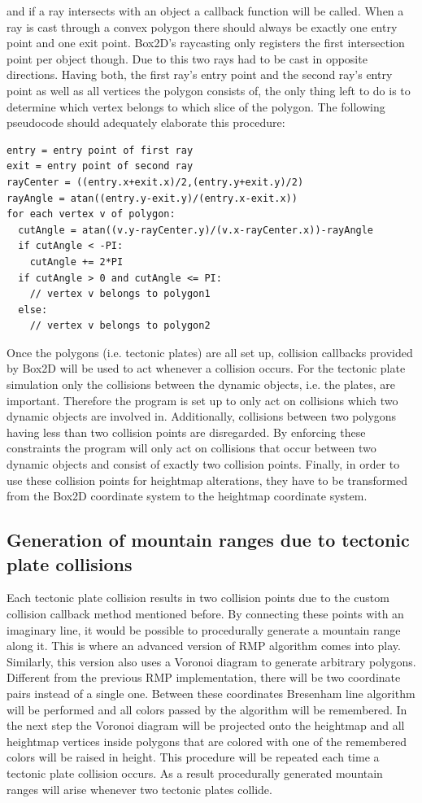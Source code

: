 \documentclass[11pt,a4paper,twoside,openright]{report}
\begin{document}
and if a ray intersects with an object a callback function will be called. When a ray is cast through a convex polygon there should always be exactly one entry point and one exit point. Box2D's raycasting only registers the first intersection point per object though. Due to this two rays had to be cast in opposite directions. Having both, the first ray's entry point and the second ray's entry point as well as all vertices the polygon consists of, the only thing left to do is to determine which vertex belongs to which slice of the polygon. The following pseudocode should adequately elaborate this procedure:
\begin{lstlisting}[caption=Point in slice check pseudocode]
entry = entry point of first ray
exit = entry point of second ray
rayCenter = ((entry.x+exit.x)/2,(entry.y+exit.y)/2)
rayAngle = atan((entry.y-exit.y)/(entry.x-exit.x))
for each vertex v of polygon:
  cutAngle = atan((v.y-rayCenter.y)/(v.x-rayCenter.x))-rayAngle
  if cutAngle < -PI:
    cutAngle += 2*PI
  if cutAngle > 0 and cutAngle <= PI:
    // vertex v belongs to polygon1
  else:
    // vertex v belongs to polygon2
\end{lstlisting}
Once the polygons (i.e. tectonic plates) are all set up, collision callbacks provided by Box2D will be used to act whenever a collision occurs. For the tectonic plate simulation only the collisions between the dynamic objects, i.e. the plates, are important. Therefore the program is set up to only act on collisions which two dynamic objects are involved in. Additionally, collisions between two polygons having less than two collision points are disregarded. By enforcing these constraints the program will only act on collisions that occur between two dynamic objects and consist of exactly two collision points. Finally, in order to use these collision points for heightmap alterations, they have to be transformed from the Box2D coordinate system to the heightmap coordinate system.

\subsection{Generation of mountain ranges due to tectonic plate collisions}
\label{subsec:generationofmountainranges}
Each tectonic plate collision results in two collision points due to the custom collision callback method mentioned before. By connecting these points with an imaginary line, it would be possible to procedurally generate a mountain range along it. This is where an advanced version of RMP algorithm comes into play. Similarly, this version also uses a Voronoi diagram to generate arbitrary polygons. Different from the previous RMP implementation, there will be two coordinate pairs instead of a single one. Between these coordinates Bresenham line algorithm will be performed and all colors passed by the algorithm will be remembered. In the next step the Voronoi diagram will be projected onto the heightmap and all heightmap vertices inside polygons that are colored with one of the remembered colors will be raised in height. This procedure will be repeated each time a tectonic plate collision occurs. As a result procedurally generated mountain ranges will arise whenever two tectonic plates collide.
\end{document}

